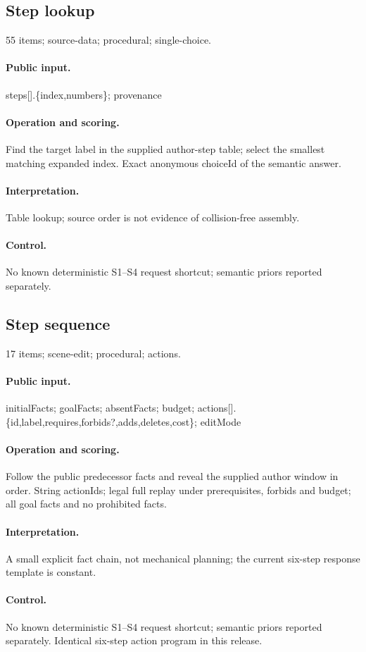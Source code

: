 \subsection{Step lookup}
55 items; source-data; procedural; single-choice.
\paragraph{Public input.}steps[].\{index,numbers\}; provenance
\paragraph{Operation and scoring.}Find the target label in the supplied author-step table; select the smallest matching expanded index. Exact anonymous choiceId of the semantic answer.
\paragraph{Interpretation.}Table lookup; source order is not evidence of collision-free assembly.
\paragraph{Control.}No known deterministic S1--S4 request shortcut; semantic priors reported separately.
\subsection{Step sequence}
17 items; scene-edit; procedural; actions.
\paragraph{Public input.}initialFacts; goalFacts; absentFacts; budget; actions[].\{id,label,requires,forbids?,adds,deletes,cost\}; editMode
\paragraph{Operation and scoring.}Follow the public predecessor facts and reveal the supplied author window in order. String actionIds; legal full replay under prerequisites, forbids and budget; all goal facts and no prohibited facts.
\paragraph{Interpretation.}A small explicit fact chain, not mechanical planning; the current six-step response template is constant.
\paragraph{Control.}No known deterministic S1--S4 request shortcut; semantic priors reported separately. Identical six-step action program in this release.
